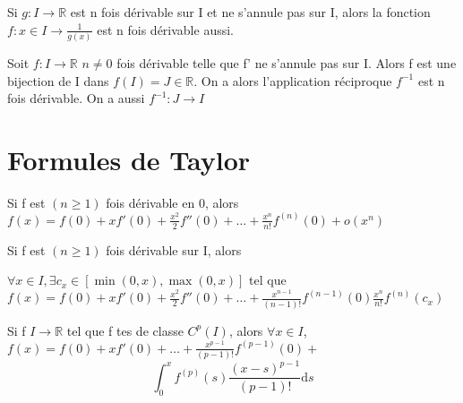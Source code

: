 \documentclass[french]{yLectureNote}
\newcommand{\R}[0]{\mathbb{R}}
\newcommand{\dd}[0]{\mathrm{d}}
\begin{document}
\begin{proposition}
Si \(g : I\to \mathbb{R}\) est n fois dérivable sur I et ne s'annule pas sur I, alors la fonction \(f: x\in I\to \frac{1}{g(x)}\) est n fois dérivable aussi.
\end{proposition}
\begin{proposition}[]
Soit \(f:I\to\mathbb{R}\) $n\neq 0$ fois dérivable telle que f' ne s'annule pas sur I. Alors f est une bijection de I dans \(f(I) = J\in\mathbb{R}\). On a alors l'application réciproque \(f^{-1}\) est n fois dérivable. On a aussi \(f^{-1} : J\to I\)
\end{proposition}

\section{Formules de Taylor}
\begin{theorem}
 Si f est $(n\geq 1)$ fois dérivable en 0, alors \(f(x) = f(0)+xf'(0)+\frac{x^2}{2} f''(0)+\dots + \frac{x^n}{n!}f^{(n)}(0)+o(x^n)\)
\end{theorem}

\begin{theorem}
 Si f est \((n\geq 1)\) fois dérivable sur I, alors

 \(\forall x\in I, \exists c_x\)\( \in[\min(0,x), \max(0,x)]\) tel que \(f(x) = f(0) + xf'(0) + \frac{x^2}{2}f''(0)+\dots+\frac{x^{n-1}}{(n-1)!}f^{(n-1)}(0)\frac{x^n}{n!}f^{(n)}(c_x)\)
\end{theorem}
\begin{theorem}
 Si f \(I\to \R\) tel que f tes de classe \(C^p(I)\), alors \(\forall x\in I\), \(f(x) = f(0)+xf'(0)+\dots+\frac{x^{p-1}}{(p-1)!}f^{(p-1)}(0) + \)
 \[\int^x_0f^{(p)}(s) \frac{(x-s)^{p-1}}{(p-1)!}\dd s\]
\end{theorem}
\end{document}
